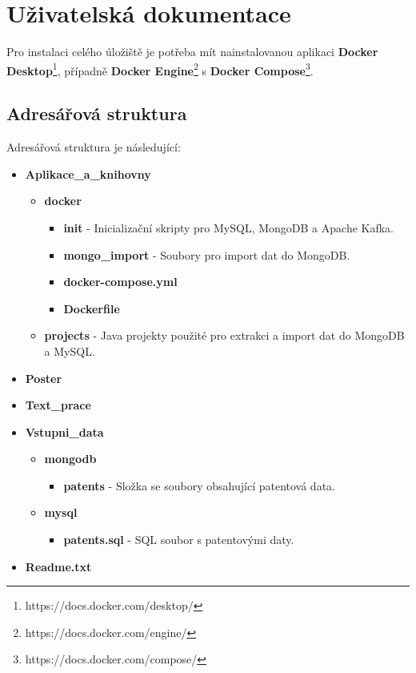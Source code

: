 \chapter{Uživatelská dokumentace}  \label{chap:uziv_doc}
Pro instalaci celého úložiště je potřeba mít nainstalovanou aplikaci \textbf{Docker Desktop}\footnote{https://docs.docker.com/desktop/}, případně \textbf{Docker Engine}\footnote{https://docs.docker.com/engine/} s \textbf{Docker Compose}\footnote{https://docs.docker.com/compose/}.

\section{Adresářová struktura}
Adresářová struktura je následující:
\begin{itemize}
\item \textbf{Aplikace\_a\_knihovny}
	\begin{itemize}
	\item \textbf{docker}
		\begin{itemize}
		\item \textbf{init} - Inicializační skripty pro MySQL, MongoDB a Apache Kafka.
		\item \textbf{mongo\_import} - Soubory pro import dat do MongoDB.
		\item \textbf{docker-compose.yml}
		\item \textbf{Dockerfile}
		\end{itemize}
	\item \textbf{projects} - Java projekty použité pro extrakci a import dat do MongoDB a MySQL.
	\end{itemize}
\item \textbf{Poster}
\item \textbf{Text\_prace}
\item \textbf{Vstupni\_data}
	\begin{itemize}
	\item \textbf{mongodb}
		\begin{itemize}
		\item \textbf{patents} - Složka se soubory obsahující patentová data.
		\end{itemize}
	\item \textbf{mysql}
		\begin{itemize}
		\item \textbf{patents.sql} - SQL soubor s patentovými daty.
		\end{itemize}
	\end{itemize}
\item \textbf{Readme.txt}
\end{itemize}
\newpage
